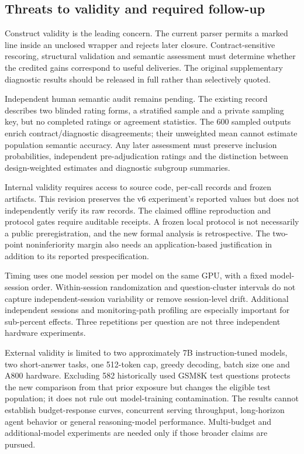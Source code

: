 \documentclass[12pt,a4paper]{article}
\begin{document}
\subsection{Threats to validity and required follow-up}
Construct validity is the leading concern. The current parser permits a marked line inside an unclosed wrapper and rejects later closure. Contract-sensitive rescoring, structural validation and semantic assessment must determine whether the credited gains correspond to useful deliveries. The original supplementary diagnostic results should be released in full rather than selectively quoted.

Independent human semantic audit remains pending. The existing record describes two blinded rating forms, a stratified sample and a private sampling key, but no completed ratings or agreement statistics. The 600 sampled outputs enrich contract/diagnostic disagreements; their unweighted mean cannot estimate population semantic accuracy. Any later assessment must preserve inclusion probabilities, independent pre-adjudication ratings and the distinction between design-weighted estimates and diagnostic subgroup summaries.

Internal validity requires access to source code, per-call records and frozen artifacts. This revision preserves the v6 experiment's reported values but does not independently verify its raw records. The claimed offline reproduction and protocol gates require auditable receipts. A frozen local protocol is not necessarily a public preregistration, and the new formal analysis is retrospective. The two-point noninferiority margin also needs an application-based justification in addition to its reported prespecification.

Timing uses one model session per model on the same GPU, with a fixed model-session order. Within-session randomization and question-cluster intervals do not capture independent-session variability or remove session-level drift. Additional independent sessions and monitoring-path profiling are especially important for sub-percent effects. Three repetitions per question are not three independent hardware experiments.

External validity is limited to two approximately 7B instruction-tuned models, two short-answer tasks, one 512-token cap, greedy decoding, batch size one and A800 hardware. Excluding 582 historically used GSM8K test questions protects the new comparison from that prior exposure but changes the eligible test population; it does not rule out model-training contamination. The results cannot establish budget-response curves, concurrent serving throughput, long-horizon agent behavior or general reasoning-model performance. Multi-budget and additional-model experiments are needed only if those broader claims are pursued.
\end{document}

